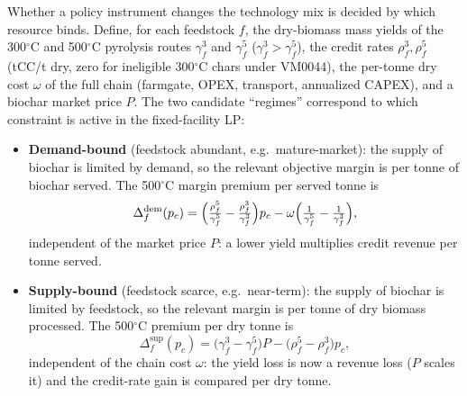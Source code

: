 Whether a policy instrument changes the technology mix is decided by
which resource binds. Define, for each feedstock $f$, the dry-biomass
mass yields of the 300$^\circ$C and 500$^\circ$C pyrolysis routes
$\gamma^3_f$ and $\gamma^5_f$ ($\gamma^3_f>\gamma^5_f$), the credit rates
$\rho^3_f, \rho^5_f$ (tCC/t dry, zero for ineligible 300$^\circ$C chars under
VM0044), the per-tonne dry cost $\omega$ of the full chain (farmgate, OPEX,
transport, annualized CAPEX), and a biochar market price $P$. The two
candidate ``regimes'' correspond to which constraint is active in the
fixed-facility LP:
\begin{itemize}
\item \textbf{Demand-bound} (feedstock abundant, e.g.\ mature-market): the
supply of biochar is limited by demand, so the relevant objective margin is
per tonne of biochar served. The 500$^\circ$C margin premium per
served tonne is
\begin{equation}
\Delta^{\mathrm{dem}}_{f}(p_c)=
\Bigl(\tfrac{\rho^5_f}{\gamma^5_f}-\tfrac{\rho^3_f}{\gamma^3_f}\Bigr)p_c
-\omega\Bigl(\tfrac{1}{\gamma^5_f}-\tfrac{1}{\gamma^3_f}\Bigr),
\end{equation}
independent of the market price $P$: a lower yield multiplies credit
revenue per tonne served.
\item \textbf{Supply-bound} (feedstock scarce, e.g.\ near-term): the supply of
biochar is limited by feedstock, so the relevant margin is per tonne of dry
biomass processed. The 500$^\circ$C premium per dry tonne is
\begin{equation}
\Delta^{\mathrm{sup}}_{f}(p_c)=
\bigl(\gamma^3_f-\gamma^5_f\bigr)P
-\bigl(\rho^5_f-\rho^3_f\bigr)p_c,
\end{equation}
independent of the chain cost $\omega$: the yield loss is now a revenue loss
($P$ scales it) and the credit-rate gain is compared per dry tonne.
\end{itemize}
